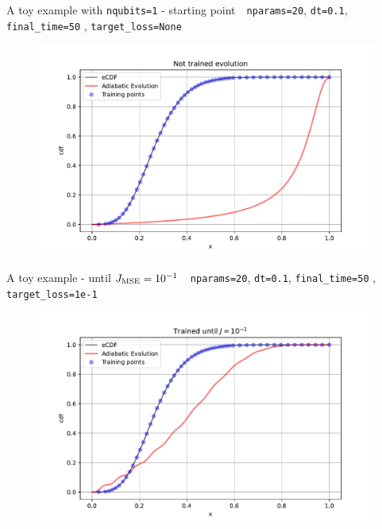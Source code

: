 \documentclass[8pt, xcolor={svgnames}, hyperref={colorlinks, linkcolor=black, citecolor=amethyst, urlcolor=amethyst}]{beamer}
\begin{document}
\begin{frame}[fragile]{A toy example with \texttt{nqubits=1} - starting point \hfill \faTerminal}
\faArrowCircleRight\,\, \texttt{nparams=20}, \texttt{dt=0.1}, \texttt{final\_time=50}
, \texttt{target\_loss=None}
\begin{figure}
    \includegraphics[width=1\textwidth]{figures/ev0.pdf}
\end{figure}
\end{frame}

\begin{frame}[fragile]{A toy example - until $J_{\rm MSE}=10^{-1}$}
\faArrowCircleRight\,\, \texttt{nparams=20}, \texttt{dt=0.1}, \texttt{final\_time=50}
, \texttt{target\_loss=1e-1}
\begin{figure}
    \includegraphics[width=1\textwidth]{figures/ev1.pdf}
\end{figure}
\end{frame}
\end{document}
